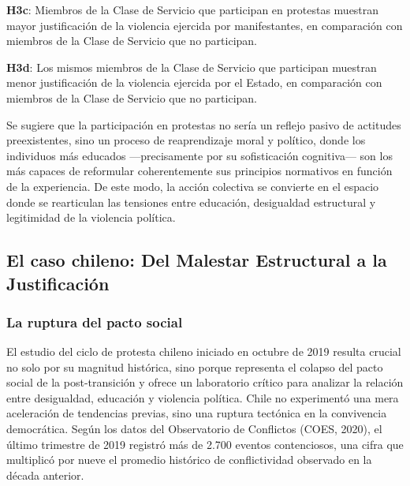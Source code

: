 \documentclass[
  13pt,
]{article}
\begin{document}
\textbf{H3c}: Miembros de la Clase de Servicio que participan en
protestas muestran mayor justificación de la violencia ejercida por
manifestantes, en comparación con miembros de la Clase de Servicio que
no participan.

\textbf{H3d}: Los mismos miembros de la Clase de Servicio que participan
muestran menor justificación de la violencia ejercida por el Estado, en
comparación con miembros de la Clase de Servicio que no participan.

Se sugiere que la participación en protestas no sería un reflejo pasivo
de actitudes preexistentes, sino un proceso de reaprendizaje moral y
político, donde los individuos más educados ---precisamente por su
sofisticación cognitiva--- son los más capaces de reformular
coherentemente sus principios normativos en función de la experiencia.
De este modo, la acción colectiva se convierte en el espacio donde se
rearticulan las tensiones entre educación, desigualdad estructural y
legitimidad de la violencia política.

\subsection{El caso chileno: Del Malestar Estructural a la
Justificación}\label{el-caso-chileno-del-malestar-estructural-a-la-justificaciuxf3n}

\subsubsection{La ruptura del pacto
social}\label{la-ruptura-del-pacto-social}

El estudio del ciclo de protesta chileno iniciado en octubre de 2019
resulta crucial no solo por su magnitud histórica, sino porque
representa el colapso del pacto social de la post-transición y ofrece un
laboratorio crítico para analizar la relación entre desigualdad,
educación y violencia política. Chile no experimentó una mera
aceleración de tendencias previas, sino una ruptura tectónica en la
convivencia democrática. Según los datos del Observatorio de Conflictos
(COES, 2020), el último trimestre de 2019 registró más de 2.700 eventos
contenciosos, una cifra que multiplicó por nueve el promedio histórico
de conflictividad observado en la década anterior.
\end{document}
